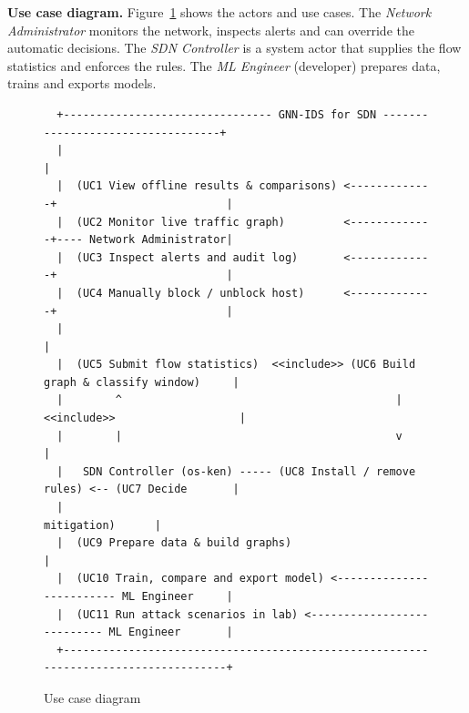 \textbf{Use case diagram.} Figure~\ref{fig:usecase} shows the actors and use cases. The \emph{Network Administrator} monitors the network, inspects alerts and can override the automatic decisions. The \emph{SDN Controller} is a system actor that supplies the flow statistics and enforces the rules. The \emph{ML Engineer} (developer) prepares data, trains and exports models.

\begin{figure}[htbp]
\centering
\scriptsize
\begin{verbatim}
  +-------------------------------- GNN-IDS for SDN ----------------------------------+
  |                                                                                    |
  |  (UC1 View offline results & comparisons) <-------------+                          |
  |  (UC2 Monitor live traffic graph)         <-------------+---- Network Administrator|
  |  (UC3 Inspect alerts and audit log)       <-------------+                          |
  |  (UC4 Manually block / unblock host)      <-------------+                          |
  |                                                                                    |
  |  (UC5 Submit flow statistics)  <<include>> (UC6 Build graph & classify window)     |
  |        ^                                          |  <<include>>                   |
  |        |                                          v                                |
  |   SDN Controller (os-ken) ----- (UC8 Install / remove rules) <-- (UC7 Decide       |
  |                                                                   mitigation)      |
  |  (UC9 Prepare data & build graphs)                                                 |
  |  (UC10 Train, compare and export model) <------------------------- ML Engineer     |
  |  (UC11 Run attack scenarios in lab) <--------------------------- ML Engineer       |
  +------------------------------------------------------------------------------------+
\end{verbatim}
\caption{Use case diagram}
\label{fig:usecase}
\end{figure}


